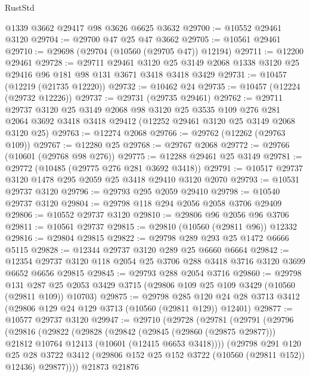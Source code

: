 \begin{lexlean}{RustStd}
\begin{coremodule}
    @1339
    @3662
    @29417
    @98
    @3626
    @6625
    @3632
@29700 := @10552 @29461 @3120
@29704 := @29700 @47 @25 @47 @3662
@29705 := @10561 @29461
@29710 := @29698 (@29704 (@10560 (@29705 @47)) @12194)
@29711 := @12200 @29461
@29728 := @29711
    @29461
    @3120
    @25
    @3149
    @2068
    @1338
    @3120
    @25
    @29416
    @96
    @181
    @98
    @131
    @3671
    @3418
    @3418
    @3429
@29731 := @10457 (@12219 (@21735 @12220))
@29732 := @10462 @24
@29735 := @10457 (@12224 (@29732 @12226))
@29737 := @29731 (@29735 @29461)
@29762 := @29711
    @29737
    @3120
    @25
    @3149
    @2068
    @98
    @3120
    @25
    @3535
    @109
    @276
    @281
    @2064
    @3692
    @3418
    @3418
    @29412
    (@12252 @29461 @3120 @25 @3149 @2068 @3120 @25)
@29763 := @12274 @2068
@29766 := @29762 (@12262 (@29763 @109))
@29767 := @12280 @25
@29768 := @29767 @2068
@29772 := @29766 (@10601 (@29768 @98 @276))
@29775 := @12288 @29461 @25 @3149
@29781 := @29772 (@10485 (@29775 @276 @281 @3692 @3418))
@29791 := @10517 @29737 @3120 @1478 @295 @2059 @25 @3418 @29410 @3120 @2070
@29793 := @10531 @29737 @3120
@29796 := @29793 @295 @2059 @29410
@29798 := @10540 @29737 @3120
@29804 := @29798 @118 @294 @2056 @2058 @3706 @29409
@29806 := @10552 @29737 @3120
@29810 := @29806 @96 @2056 @96 @3706
@29811 := @10561 @29737
@29815 := @29810 (@10560 (@29811 @96)) @12332
@29816 := @29804 @29815
@29822 := @29798 @289 @293 @25 @1472 @6666 @5115
@29828 := @12344 @29737 @3120 @289 @25 @6660 @6664
@29842 := @12354 @29737 @3120 @118 @2054 @25 @3706 @288 @3418 @3716 @3120 @3699 @6652 @6656 @29815
@29845 := @29793 @288 @2054 @3716
@29860 := @29798
    @131
    @287
    @25
    @2053
    @3429
    @3715
    (@29806 @109 @25 @109 @3429 (@10560 (@29811 @109)) @10703)
@29875 := @29798
    @285
    @120
    @24
    @28
    @3713
    @3412
    (@29806 @129 @24 @129 @3713 (@10560 (@29811 @129)) @12401)
@29877 := @10577 @29737 @3120
@29947 := @29710
    (@29728
      (@29781
        (@29791
          (@29796
            (@29816
              (@29822
                (@29828
                  (@29842
                    (@29845 (@29860 (@29875 @29877)))
                    @21812
                    @10764
                    @12413
                    (@10601 (@12415 @6653 @3418))))
                (@29798
                  @291
                  @120
                  @25
                  @28
                  @3722
                  @3412
                  (@29806 @152 @25 @152 @3722 (@10560 (@29811 @152)) @12436)
                  @29877))))
          @21873
          @21876

\end{coremodule}
\end{lexlean}
